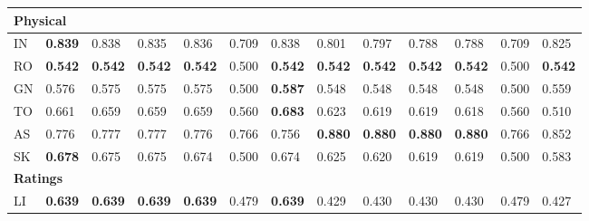 \begin{longtable}{ lllllllllllll }
\hline
\multicolumn{13}{|l|}{\textbf{Physical}} \\
\hline
\textsf{IN}                   & \bf{0.839} & 0.838 & 0.835 & 0.836 & 0.709 & 0.838 & 0.801 & 0.797 & 0.788 & 0.788 & 0.709 & 0.825 \\
\textsf{RO}                   & \bf{0.542} & \bf{0.542} & \bf{0.542} & \bf{0.542} & 0.500 & \bf{0.542} & \bf{0.542} & \bf{0.542} & \bf{0.542} & \bf{0.542} & 0.500 & \bf{0.542} \\
\textsf{GN}                   & 0.576 & 0.575 & 0.575 & 0.575 & 0.500 & \bf{0.587} & 0.548 & 0.548 & 0.548 & 0.548 & 0.500 & 0.559 \\
\textsf{TO}                   & 0.661 & 0.659 & 0.659 & 0.659 & 0.560 & \bf{0.683} & 0.623 & 0.619 & 0.619 & 0.618 & 0.560 & 0.510 \\
\textsf{AS}                   & 0.776 & 0.777 & 0.777 & 0.776 & 0.766 & 0.756 & \bf{0.880} & \bf{0.880} & \bf{0.880} & \bf{0.880} & 0.766 & 0.852 \\
\textsf{SK}                   & \bf{0.678} & 0.675 & 0.675 & 0.674 & 0.500 & 0.674 & 0.625 & 0.620 & 0.619 & 0.619 & 0.500 & 0.583 \\

\hline
\multicolumn{13}{|l|}{\textbf{Ratings}} \\
\hline
\textsf{LI}                   & \bf{0.639} & \bf{0.639} & \bf{0.639} & \bf{0.639} & 0.479 & \bf{0.639} & 0.429 & 0.430 & 0.430 & 0.430 & 0.479 & 0.427 \\


\end{longtable}
